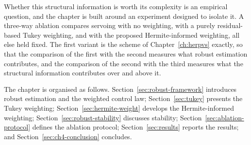 Whether this structural information is worth its complexity is an empirical
question, and the chapter is built around an experiment designed to isolate
it. A three-way ablation compares servoing with no weighting, with a purely
residual-based Tukey weighting, and with the proposed Hermite-informed
weighting, all else held fixed. The first variant is the scheme of
Chapter~\ref{ch:herpvs} exactly, so that the comparison of the first with the
second measures what robust estimation contributes, and the comparison of the
second with the third measures what the structural information contributes
over and above it.

The chapter is organised as follows. Section~\ref{sec:robust-framework}
introduces robust estimation and the weighted control law;
Section~\ref{sec:tukey} presents the Tukey weighting;
Section~\ref{sec:hermite-weight} develops the Hermite-informed weighting;
Section~\ref{sec:robust-stability} discusses stability;
Section~\ref{sec:ablation-protocol} defines the ablation protocol;
Section~\ref{sec:results} reports the results; and
Section~\ref{sec:ch4-conclusion} concludes.

%
%
